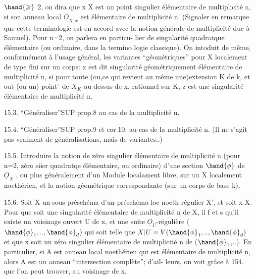 
$\hand{\geqslant}$ 2, on dira que x \hand{$\in$} X est un point singulier élémentaire de multiplicité
n, si son anneau local $\underline{O}_{X,x}$ est élémentaire de multiplicité n. (Signaler
en remarque que cette  terminologie est en accord avec la notion
générale de multiplicité due à Samuel). Pour n=2, on parlera en particu-%
lier de singularité quadratque élémentaire (ou ordinaire, dans la termino
logie classique). On intoduit de même, conformément à l'usage général,
les variantes ``géométriques'' pour X localement de type fini sur un corps:
x  est dit singularité géométriquement élémentaire de multiplicité n, si
pour toute (ou,ce qui revient au même une)extension K de k, et out
(ou un) point$^{z}$ de $X_{K}$ au dessus de x, rationnel sur K, z est une
singularité élémentaire de multiplicité n.

15.3. ``Généraliser''SUP prop.8 au cas de la multiplicité n.

15.4. ``Généraliser''SUP prop.9 et cor.10. au cas de la multiplicité n.
(Il ne s'agit pas vraiment de généralisations, mais de variantes..)

15.5. Introduire la notion de zéro singulier élémentaire de multiplicité
n (pour n=2, zéro siier quadratqe élémentaire, ou ordinaire) d'une
section $\hand{\phi}$ de $\underline{O}_{X}$ , ou plus généralement d'un Module localament libre, sur
un X localement noethérien, et la notion géométrique correspondante
(sur un corps de base k).

15.6. Soit X un sous-préschéma d'un préschéma loc noeth régulier X', et
soit x \hand{$\in$}X. Pour que  soit une singularité élémentaire de multiplicité
n de X, il f et s qu'il existe un voisinage ouvert U de x, et une
suite $\underline{O}_{U}$-régulière ($\hand{\phi}_{1},..,\hand{\phi}_{d}$) qui soit telle que $X|U = V(\hand{\phi}_{1},..,\hand{\phi}_{d})$ et
que x soit un zéro singulier élémentaire de multiplicité n de ($\hand{\phi}_{1}$,..).
En particulier, si A est anneau local noethérien qui est élémentaire
 de multiplicité n, alors A est un anneau ``intersection complète''; d'ail-%
leurs, on voit grâce à 154. que l'on peut trouver, au voisinage de x,

